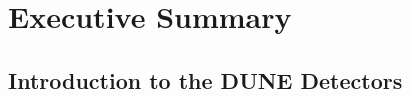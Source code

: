 \chapter{Executive Summary}
\label{ch:detectors-execsumm}



\section{Introduction to the DUNE Detectors}
\label{sec:intro-dune-det}